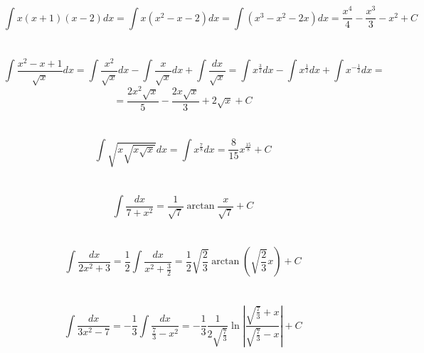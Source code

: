\documentclass{article}
\begin{document}
    \begin{center}
        
        \section{}
            \[\int x(x + 1)(x - 2)dx = \int x(x^2 - x - 2)dx =
            \int (x^3 - x^2 - 2x)dx = \frac{x^4}{4} - \frac{x^3}{3} - x^2 + C\]

        \section{}
            \[\int \frac{x^2-x+1}{\sqrt{x}}dx = \int \frac{x^2}{\sqrt{x}}dx -
            \int \frac{x}{\sqrt{x}}dx + \int \frac{dx}{\sqrt{x}} =
            \int x^{\frac{3}{2}}dx - \int x^{\frac{1}{2}}dx +
            \int x^{-\frac{1}{2}}dx = \] 
            \[= \frac{2x^2 \sqrt{x}}{5} - \frac{2x \sqrt{x}}{3} + 2 \sqrt{x} + C\]    
    
        \section{}
            \[\int \sqrt{x \sqrt{x \sqrt{x}}}dx = \int x^{\frac{7}{8}}dx =
            \frac{8}{15} x^{\frac{15}{8}} + C\]
            
        \section{}
            \[\int \frac{dx}{7 + x^2} = \frac{1}{\sqrt{7}}
            \arctan{\frac{x}{\sqrt{7}}} + C\]
            
        \section{}
            \[\int \frac{dx}{2x^2 + 3} = \frac{1}{2} \int
            \frac{dx}{x^2 + \frac{3}{2}} = \frac{1}{2} \sqrt{\frac{2}{3}}
            \arctan{\left(\sqrt{\frac{2}{3}}x\right)} + C\]
            
        \section{}
            \[\int \frac{dx}{3x^2 - 7} = - \frac{1}{3}
            \int \frac{dx}{\frac{7}{3} - x^2} = - \frac{1}{3}
            \frac{1}{2 \sqrt{\frac{7}{3}}} \ln{\left|
            \frac{\sqrt{\frac{7}{3}} + x}{\sqrt{\frac{7}{3}} - x} \right|} + C\]    
    

\end{center}
\end{document}

